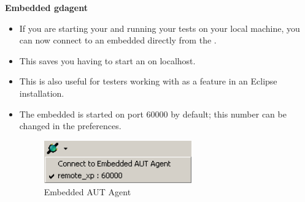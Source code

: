 
\textbf{Embedded gdagent{}}\\
\begin{itemize}
\item If you are starting your \gdaut{} and running your tests on your local machine, 
you can now connect to an embedded \gdagent{} directly from the \ite. 
\item This saves you having to start an \gdagent{} on localhost. 
\item This is also useful for testers working with \jb{} as a feature in an Eclipse installation. 
\item The embedded \gdagent{} is started on port 60000 by default; this number can be changed in the preferences.

\begin{figure}[h]
\begin{center}
\includegraphics[width=0.60\textwidth]{52/ps/EmbeddedAgent}
\caption{Embedded AUT Agent}
\label{RNEmbeddedAgent}
\end{center}
\end{figure}


\end{itemize}


